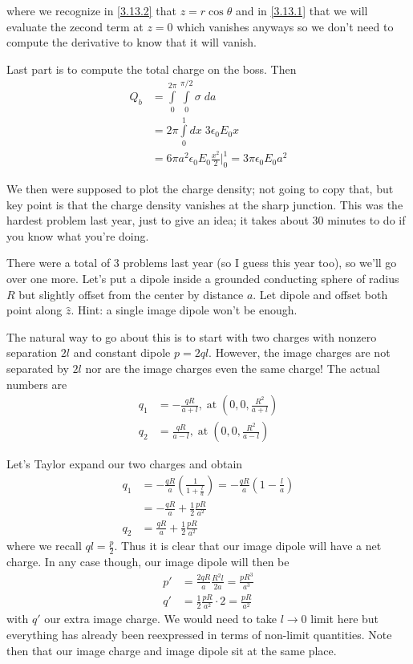 \documentclass[10pt]{report}
\begin{document}
where we recognize in \eqref{3.13.2} that $z = r\cos\theta$ and in \eqref{3.13.1} that we will evaluate the zecond term at $z=0$ which vanishes anyways so we don't need to compute the derivative to know that it will vanish. 

Last part is to compute the total charge on the boss. Then
\begin{align}
    Q_b &= \displaystyle\int\limits_{0}^{2\pi}\displaystyle\int\limits_{0}^{\pi/2}\sigma\;da\\
    &= 2\pi\displaystyle\int\limits_{0}^{1}dx \;3\epsilon_0E_0x\\
    &= 6\pi a^2\epsilon_0E_0\frac{x^2}{2}\Big|_{0}^1 = 3\pi\epsilon_0E_0a^2
\end{align}

We then were supposed to plot the charge density; not going to copy that, but key point is that the charge density vanishes at the sharp junction. This was the hardest problem last year, just to give an idea; it takes about 30 minutes to do if you know what you're doing. 

There were a total of 3 problems last year (so I guess this year too), so we'll go over one more. Let's put a dipole inside a grounded conducting sphere of radius $R$ but slightly offset from the center by distance $a$. Let dipole and offset both point along $\hat{z}$. Hint: a single image dipole won't be enough.

The natural way to go about this is to start with two charges with nonzero separation $2l$ and constant dipole $p = 2ql$. However, the image charges are not separated by $2l$ nor are the image charges even the same charge! The actual numbers are
\begin{align}
    q_1 &= -\frac{qR}{a+l}, \;\mathrm{at}\; \left( 0,0,\frac{R^2}{a+l} \right)\\
    q_2 &= \frac{qR}{a-l}, \;\mathrm{at}\; \left( 0,0,\frac{R^2}{a-l} \right)
\end{align}

Let's Taylor expand our two charges and obtain
\begin{align}
    q_1 &= -\frac{qR}{a}\left( \frac{1}{1 + \frac{l}{a}} \right) = -\frac{qR}{a}\left( 1 - \frac{l}{a} \right)\\
    &= -\frac{qR}{a} + \frac{1}{2}\frac{pR}{a^2}\\
    q_2 &= \frac{qR}{a} + \frac{1}{2}\frac{pR}{a^2}
\end{align}
where we recall $ql = \frac{p}{2}$. Thus it is clear that our image dipole will have a net charge. In any case though, our image dipole will then be 
\begin{align}
    p' &= \frac{2qR}{a}\frac{R^2l}{2a} = \frac{pR^3}{a^3}\\
    q' &= \frac{1}{2}\frac{pR}{a^2}\cdot 2 = \frac{pR}{a^2}
\end{align}
with $q'$ our extra image charge. We would need to take $l\to 0$ limit here but everything has already been reexpressed in terms of non-limit quantities. Note then that our image charge and image dipole sit at the same place.
\end{document}
